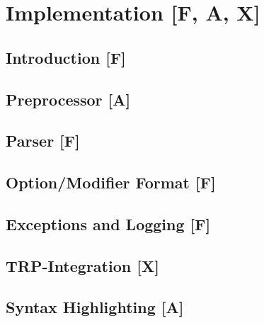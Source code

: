 \documentclass[12pt,a4paper,twoside,open=right,titlepage,listof=totoc,bibliography=totoc,chapteratlists=0pt]{scrreprt}
\begin{document}
\part{Implementation [F, A, X]}\label{part:implementation}

\chapter{Introduction [F]}\label{chap:implementation-introduction}


\chapter{Preprocessor [A]}\label{chap:preprocessor}


\chapter{Parser [F]}\label{chap:parser}


\chapter{Option/Modifier Format [F]}\label{chap:option-modifier-format}


\chapter{Exceptions and Logging [F]}\label{chap:exceptions-and-warnings}


\chapter{TRP-Integration [X]}\label{chap:trp-integration}


\chapter{Syntax Highlighting [A]}\label{chap:syntax-highlighting}

\end{document}

